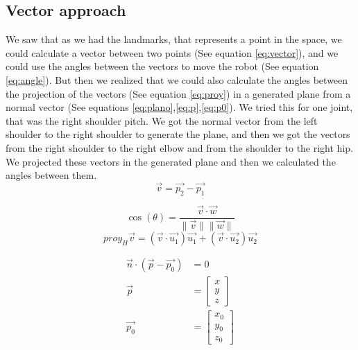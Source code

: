 \documentclass[conference]{IEEEtran}
\begin{document}
\subsection{Vector approach}
We saw that as we had the landmarks, that represents a point in the space, we could calculate a vector between two points (See equation \ref{eq:vector}), and we could use the angles between the vectors to move the robot (See equation \ref{eq:angle}). But then we realized that we could also calculate the angles between the projection of the vectors (See equation \ref{eq:proy}) in a generated plane from a normal vector (See equations \ref{eq:plano},\ref{eq:p},\ref{eq:p0}). We tried this for one joint, that was the right shoulder pitch. We got the normal vector from the left shoulder to the right shoulder to generate the plane, and then we got the vectors from the right shoulder to the right elbow and from the shoulder to the right hip. We projected these vectors in the generated plane and then we calculated the angles between them. 
\begin{equation}\label{eq:vector}
    \vec{v} = \vec{p_2} - \vec{p_1}
\end{equation}

\begin{equation}\label{eq:angle}
    \cos(\theta) = \frac{\vec{v} \cdot \vec{w}}{\| \vec{v} \| \| \vec{w} \|}
\end{equation}
\begin{equation}\label{eq:proy}
    proy_H \vec{v} = \left( \vec{v} \cdot \vec{u_1} \right) \vec{u_1} + \left( \vec{v} \cdot \vec{u_2} \right) \vec{u_2}
\end{equation}


 \begin{subequations}
    \begin{align}
        \vec{n} \cdot (\vec{p} - \vec{p_0}) &= 0 \label{eq:plano} \\
        \vec{p} &= \begin{bmatrix}
        x \\
        y \\
        z
        \end{bmatrix} \label{eq:p} \\
        \vec{p_0} &= \begin{bmatrix}
        x_0 \\
        y_0 \\
        z_0
        \end{bmatrix} \label{eq:p0}
    \end{align}
 \end{subequations}
\end{document}
